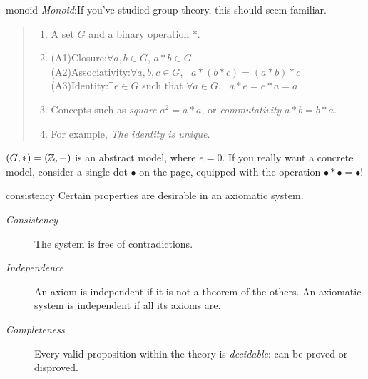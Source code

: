 \begin{example}{}{monoid}
	\emph{Monoid}:\lstsp If you've studied group theory, this should seem familiar.\vspace{-5pt}
	\begin{quote}
		\begin{enumerate}
		  \item A set $G$ and a binary operation $\ast$.
		  \item (A1)\lstsp Closure:\quad $\forall a,b\in G$, $a\ast b\in G$\\
	  	\lstsp(A2)\lstsp Associativity:\quad $\forall a,b,c\in G$, \ $a\ast(b\ast c)=(a\ast b)\ast c$\\
	  	\lstsp(A3)\lstsp Identity:\quad $\exists e\in G$ such that $\forall a\in G$, \ $a\ast e=e\ast a=a$
		  \item Concepts such as \emph{square} $a^2=a\ast a$, or \emph{commutativity} $a\ast b=b\ast a$.
		  \item For example, \emph{The identity is unique.}
		\end{enumerate}
	\end{quote}
	$(G,*)=(\mathbb{Z},+)$ is an abstract model, where $e=0$. If you really want a concrete model, consider a single dot $\bullet$ on the page, equipped with the operation $\bullet *\bullet =\bullet$!
\end{example}


\goodbreak



\begin{defn}{}{consistency}
	Certain properties are desirable in an axiomatic system.
	\begin{description}
		\item[\normalfont\emph{Consistency}] The system is free of contradictions.
		\item[\normalfont\emph{Independence}] An axiom is independent if it is not a theorem of the others. An axiomatic system is independent if all its axioms are. 
		\item[\normalfont\emph{Completeness}] Every valid proposition within the theory is \emph{decidable}: can be proved or disproved.
	\end{description}
\end{defn}

